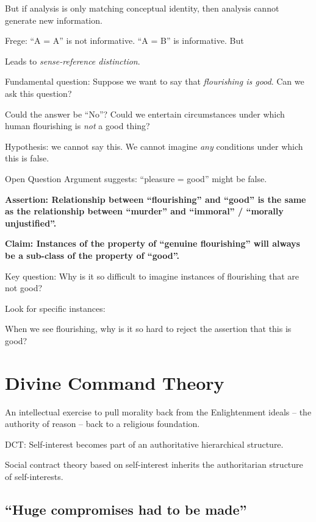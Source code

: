 \documentclass[
]{book}
\begin{document}
But if analysis is only matching conceptual identity, then analysis cannot generate new information.

Frege: ``A = A'' is not informative. ``A = B'' is informative. But

Leads to \emph{sense-reference distinction}.

Fundamental question:
Suppose we want to say that \emph{flourishing is good}.
Can we ask this question?

Could the answer be ``No''?
Could we entertain circumstances under which human flourishing is \emph{not} a good thing?

Hypothesis: we cannot say this.
We cannot imagine \emph{any} conditions under which this is false.

Open Question Argument suggests: ``pleasure = good'' might be false.

\textbf{Assertion: Relationship between ``flourishing'' and ``good'' is the same as the relationship between ``murder'' and ``immoral'' / ``morally unjustified''.}

\textbf{Claim: Instances of the property of ``genuine flourishing'' will always be a sub-class of the property of ``good''.}

Key question: Why is it so difficult to imagine instances of flourishing that are not good?

Look for specific instances:

When we see flourishing, why is it so hard to reject the assertion that this is good?

\hypertarget{divine-command-theory}{%
\section{Divine Command Theory}\label{divine-command-theory}}

An intellectual exercise to pull morality back from the Enlightenment ideals -- the authority of reason -- back to a religious foundation.

DCT: Self-interest becomes part of an authoritative hierarchical structure.

Social contract theory based on self-interest inherits the authoritarian structure of self-interests.

\hypertarget{huge-compromises-had-to-be-made}{%
\subsection{``Huge compromises had to be made''}\label{huge-compromises-had-to-be-made}}
\end{document}
